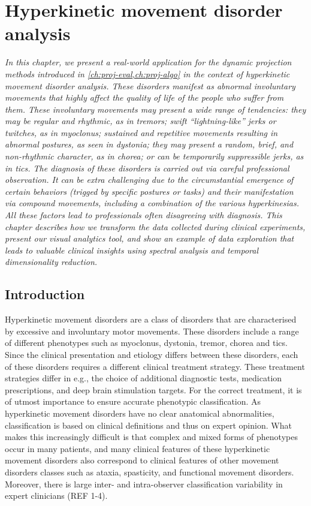 \chapter{Hyperkinetic movement disorder analysis}
\label{ch:nemo}

\textit{
In this chapter, we present a real-world application for the dynamic projection methods introduced in \cref{ch:proj-eval,ch:proj-algo} in the context of hyperkinetic movement disorder analysis. These disorders manifest as abnormal involuntary movements that highly affect the quality of life of the people who suffer from them. These involuntary movements may present a wide range of tendencies: they may be regular and rhythmic, as in tremors; swift ``lightning-like'' jerks or twitches, as in myoclonus; sustained and repetitive movements resulting in abnormal postures, as seen in dystonia; they may present a random, brief, and non-rhythmic character, as in chorea; or can be temporarily suppressible jerks, as in tics.
The diagnosis of these disorders is carried out via careful professional observation. It can be extra challenging due to the circumstantial emergence of certain behaviors (trigged by specific postures or tasks) and their manifestation via compound movements, including a combination of the various hyperkinesias. All these factors lead to professionals often disagreeing with diagnosis. 
This chapter describes how we transform the data collected during clinical experiments, present our visual analytics tool, and show an example of data exploration that leads to valuable clinical insights using spectral analysis and temporal dimensionality reduction.
}

\vspace{5mm} %



\section{Introduction}

Hyperkinetic movement disorders are a class of disorders that are characterised by excessive and involuntary motor movements. These disorders include a range of different phenotypes such as myoclonus, dystonia, tremor, chorea and tics. Since the clinical presentation and etiology differs between these disorders, each of these disorders requires a different clinical treatment strategy. These treatment strategies differ in e.g., the choice of additional diagnostic tests, medication prescriptions, and deep brain stimulation targets. For the correct treatment, it is of utmost importance to ensure accurate phenotypic classification. As hyperkinetic movement disorders have no clear anatomical abnormalities, classification is based on clinical definitions and thus on expert opinion. What makes this increasingly difficult is that complex and mixed forms of phenotypes occur in many patients, and many clinical features of these hyperkinetic movement disorders also correspond to clinical features of other movement disorders classes such as ataxia, spasticity, and functional movement disorders. Moreover, there is large inter- and intra-observer classification variability in expert clinicians (REF 1-4).

